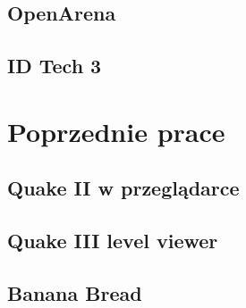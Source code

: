 \subsection{OpenArena}
\label{ssec:openArena}

\subsection{ID Tech 3}
\label{ssec:idTech}


\section{Poprzednie prace}
\label{sec:poprzedniePrace}

\subsection{Quake II w przeglądarce}
\label{ssec:quake2web}

\subsection{Quake III level viewer}
\label{ssec:quake3web}

\subsection{Banana Bread}
\label{ssec:bananaBread}



